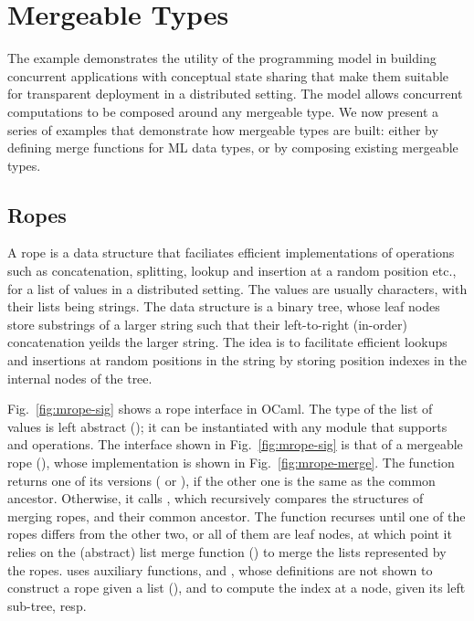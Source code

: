 \section{Mergeable Types}
\label{sec:mergeable_types}



The \drawsome example demonstrates the utility of the \name
programming model in building concurrent applications with conceptual
state sharing that make them suitable for transparent deployment in a
distributed setting. The model allows concurrent computations to be
composed around any mergeable type. We now present a series of
examples that demonstrate how mergeable types are built: either by
defining merge functions for ML data types, or by composing existing
mergeable types.

\subsection{Ropes}
\label{sec:ropes}

A rope is a data structure that faciliates efficient implementations
of operations such as concatenation, splitting, lookup and insertion
at a random position etc., for a list of values in a distributed
setting. The values are usually characters, with their lists being
strings. The data structure is a binary tree, whose leaf nodes store
substrings of a larger string such that their left-to-right (in-order)
concatenation yeilds the larger string. The idea is to facilitate
efficient lookups and insertions at random positions in the string by
storing position indexes in the internal nodes of the tree.

Fig.~\ref{fig:mrope-sig} shows a rope interface in OCaml. The type of
the list of values is left abstract (); it can be instantiated
with any module that supports  and  operations. The
interface shown in Fig.~\ref{fig:mrope-sig} is that of a mergeable
rope (), whose  implementation is shown in
Fig.~\ref{fig:mrope-merge}. The function returns one of its versions
( or ), if the other one is the same as the common
ancestor. Otherwise, it calls , which recursively
compares the structures of merging ropes, and their common ancestor.
The function recurses until one of the ropes differs from the other
two, or all of them are leaf nodes, at which point it relies on the
(abstract) list merge function () to merge the lists
represented by the ropes.  uses auxiliary functions,
 and , whose definitions are not shown to
construct a rope given a list (), and to compute the index at a
node, given its left sub-tree, resp.

